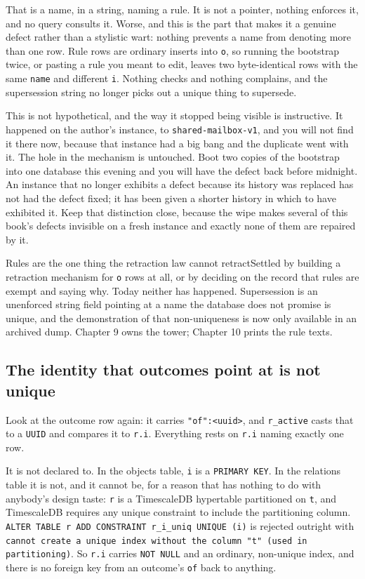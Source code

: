 That is a name, in a string, naming a rule. It is not a pointer, nothing enforces it, and no query consults it. Worse, and this is the part that makes it a genuine defect rather than a stylistic wart: nothing prevents a name from denoting more than one row. Rule rows are ordinary inserts into \texttt{o}, so running the bootstrap twice, or pasting a rule you meant to edit, leaves two byte-identical rows with the same \texttt{name} and different \texttt{i}. Nothing checks and nothing complains, and the supersession string no longer picks out a unique thing to supersede.

This is not hypothetical, and the way it stopped being visible is instructive. It happened on the author's instance, to \texttt{shared-mailbox-v1}, and you will not find it there now, because that instance had a big bang and the duplicate went with it. The hole in the mechanism is untouched. Boot two copies of the bootstrap into one database this evening and you will have the defect back before midnight. An instance that no longer exhibits a defect because its history was replaced has not had the defect fixed; it has been given a shorter history in which to have exhibited it. Keep that distinction close, because the wipe makes several of this book's defects invisible on a fresh instance and exactly none of them are repaired by it.

\begin{Open}{Rules are the one thing the retraction law cannot retract}{Settled by building a retraction mechanism for \texttt{o} rows at all, or by deciding on the record that rules are exempt and saying why.}
Today neither has happened. Supersession is an unenforced string field pointing at a name the database does not promise is unique, and the demonstration of that non-uniqueness is now only available in an archived dump. Chapter 9 owns the tower; Chapter 10 prints the rule texts.
\end{Open}

\subsection*{The identity that outcomes point at is not unique}

Look at the outcome row again: it carries \texttt{"of":<uuid>}, and \texttt{r\_active} casts that to a \texttt{UUID} and compares it to \texttt{r.i}. Everything rests on \texttt{r.i} naming exactly one row.

It is not declared to. In the objects table, \texttt{i} is a \texttt{PRIMARY KEY}. In the relations table it is not, and it cannot be, for a reason that has nothing to do with anybody's design taste: \texttt{r} is a TimescaleDB hypertable partitioned on \texttt{t}, and TimescaleDB requires any unique constraint to include the partitioning column. \texttt{ALTER TABLE r ADD CONSTRAINT r\_i\_uniq UNIQUE (i)} is rejected outright with \texttt{cannot create a unique index without the column "t" (used in partitioning)}. So \texttt{r.i} carries \texttt{NOT NULL} and an ordinary, non-unique index, and there is no foreign key from an outcome's \texttt{of} back to anything.

